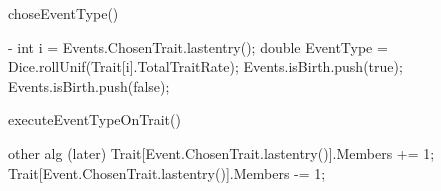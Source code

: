 \documentclass{article}
\begin{document}
\begin{algorithm}[H]
	\caption{choseEventType()}
	\begin{algorithmic}[1]
		\REQUIRE -
		\STATE int i = Events.ChosenTrait.lastentry();
		\STATE double EventType = Dice.rollUnif(Trait[i].TotalTraitRate);
			\STATE Events.isBirth.push(true);
		\ELSE
			\STATE Events.isBirth.push(false);
		\ENDIF
	\end{algorithmic}
\end{algorithm}

\begin{algorithm}[H]
	\caption{executeEventTypeOnTrait()}
	\begin{algorithmic}[1]
		 other alg (later)
			\STATE Trait[Event.ChosenTrait.lastentry()].Members += 1;
		\ELSE
			\STATE Trait[Event.ChosenTrait.lastentry()].Members -= 1;
		\ENDIF
	\end{algorithmic}
\end{algorithm}
\listofalgorithms
\end{document}
